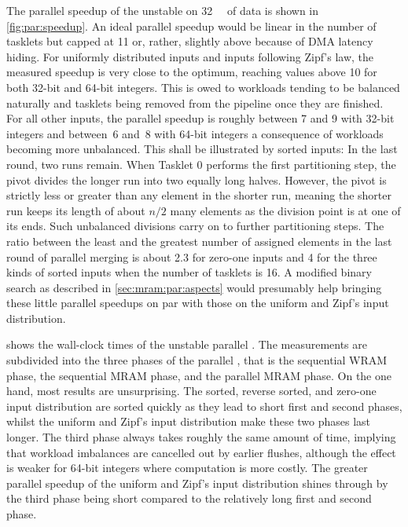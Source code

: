 The parallel speedup of the unstable \MS{} on \qty{32}{\mebi\byte} of data is shown in \cref{fig:par:speedup}.
An ideal parallel speedup would be linear in the number of tasklets but capped at 11 or, rather, slightly above because of \ac{DMA} latency hiding.
For uniformly distributed inputs and inputs following Zipf's law, the measured speedup is very close to the optimum, reaching values above 10 for both 32-bit and 64-bit integers.
This is owed to workloads tending to be balanced naturally and tasklets being removed from the pipeline once they are finished.
For all other inputs, the parallel speedup is roughly between 7 and 9 with 32-bit integers and between~6 and~8 with 64-bit integers \Dash a consequence of workloads becoming more unbalanced.
This shall be illustrated by sorted inputs:
In the last round, two runs remain.
When Tasklet 0 performs the first partitioning step, the pivot divides the longer run into two equally long halves.
However, the pivot is strictly less or greater than any element in the shorter run, meaning the shorter run keeps its length of about \(n/2\) many elements as the division point is at one of its ends.
Such unbalanced divisions carry on to further partitioning steps.
The ratio between the least and the greatest number of assigned elements in the last round of parallel merging is about 2.3 for zero-one inputs and 4 for the three kinds of sorted inputs when the number of tasklets is 16.
A modified binary search as described in \cref{sec:mram:par:aspects} would presumably help bringing these little parallel speedups on par with those on the uniform and Zipf's input distribution.

 shows the wall-clock times of the unstable parallel \MS{}.
The measurements are subdivided into the three phases of the parallel \MS{}, that is the sequential \ac{WRAM} phase, the sequential \ac{MRAM} phase, and the parallel \ac{MRAM} phase.
On the one hand, most results are unsurprising.
The sorted, reverse sorted, and zero-one input distribution are sorted quickly as they lead to short first and second phases, whilst the uniform and Zipf's input distribution make these two phases last longer.
The third phase always takes roughly the same amount of time, implying that workload imbalances are cancelled out by earlier flushes, although the effect is weaker for 64-bit integers where computation is more costly.
The greater parallel speedup of the uniform and Zipf's input distribution shines through by the third phase being short compared to the relatively long first and second phase.

